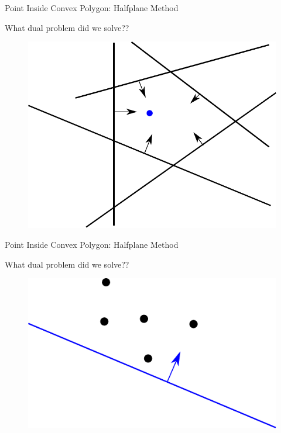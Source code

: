 \documentclass{beamer}
\begin{document}
\begin{frame}{Point Inside Convex Polygon: Halfplane Method}

What dual problem did we solve??

\begin{figure}[t]
	\centering
	\includegraphics[width=\textwidth]{HalfplanePrimal.pdf}
\end{figure}

\end{frame}


\begin{frame}{Point Inside Convex Polygon: Halfplane Method}

What dual problem did we solve??

\begin{figure}[t]
	\centering
	\includegraphics[width=\textwidth]{HalfplaneDual.pdf}
\end{figure}

\end{frame}





\end{document}
